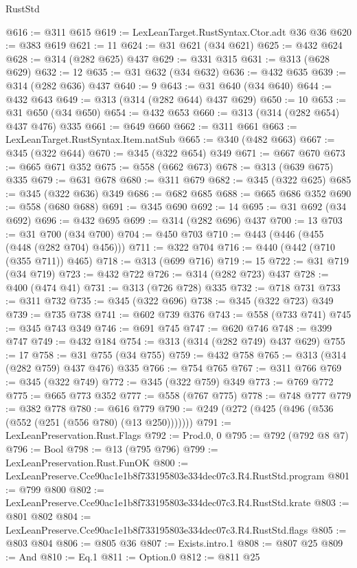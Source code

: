 \begin{lexlean}{RustStd}
\begin{coremodule}
@616 := @311 @615
@619 := LexLeanTarget.RustSyntax.Ctor.adt @36 @36
@620 := @383 @619
@621 := 11
@624 := @31 @621 (@34 @621)
@625 := @432 @624
@628 := @314 (@282 @625) @437
@629 := @331 @315
@631 := @313 (@628 @629)
@632 := 12
@635 := @31 @632 (@34 @632)
@636 := @432 @635
@639 := @314 (@282 @636) @437
@640 := 9
@643 := @31 @640 (@34 @640)
@644 := @432 @643
@649 := @313 (@314 (@282 @644) @437 @629)
@650 := 10
@653 := @31 @650 (@34 @650)
@654 := @432 @653
@660 := @313 (@314 (@282 @654) @437 @476) @335
@661 := @649 @660
@662 := @311 @661
@663 := LexLeanTarget.RustSyntax.Item.natSub
@665 := @340 (@482 @663)
@667 := @345 (@322 @644)
@670 := @345 (@322 @654) @349
@671 := @667 @670
@673 := @665 @671 @352
@675 := @558 (@662 @673)
@678 := @313 (@639 @675) @335
@679 := @631 @678
@680 := @311 @679
@682 := @345 (@322 @625)
@685 := @345 (@322 @636) @349
@686 := @682 @685
@688 := @665 @686 @352
@690 := @558 (@680 @688)
@691 := @345 @690
@692 := 14
@695 := @31 @692 (@34 @692)
@696 := @432 @695
@699 := @314 (@282 @696) @437
@700 := 13
@703 := @31 @700 (@34 @700)
@704 := @450 @703
@710 := @443 (@446 (@455 (@448 (@282 @704) @456)))
@711 := @322 @704
@716 := @440 (@442 (@710 (@355 @711)) @465)
@718 := @313 (@699 @716)
@719 := 15
@722 := @31 @719 (@34 @719)
@723 := @432 @722
@726 := @314 (@282 @723) @437
@728 := @400 (@474 @41)
@731 := @313 (@726 @728) @335
@732 := @718 @731
@733 := @311 @732
@735 := @345 (@322 @696)
@738 := @345 (@322 @723) @349
@739 := @735 @738
@741 := @602 @739 @376
@743 := @558 (@733 @741)
@745 := @345 @743 @349
@746 := @691 @745
@747 := @620 @746
@748 := @399 @747
@749 := @432 @184
@754 := @313 (@314 (@282 @749) @437 @629)
@755 := 17
@758 := @31 @755 (@34 @755)
@759 := @432 @758
@765 := @313 (@314 (@282 @759) @437 @476) @335
@766 := @754 @765
@767 := @311 @766
@769 := @345 (@322 @749)
@772 := @345 (@322 @759) @349
@773 := @769 @772
@775 := @665 @773 @352
@777 := @558 (@767 @775)
@778 := @748 @777
@779 := @382 @778
@780 := @616 @779
@790 := @249 (@272 (@425 (@496 (@536 (@552 (@251 (@556 @780) (@13 @250)))))))
@791 := LexLeanPreservation.Rust.Flags
@792 := Prod.{0, 0}
@795 := @792 (@792 @8 @7)
@796 := Bool
@798 := @13 (@795 @796)
@799 := LexLeanPreservation.Rust.FunOK
@800 := LexLeanPreserve.Cce90ac1e1b8f733195803e334dec07c3.R4.RustStd.program
@801 := @799 @800
@802 := LexLeanPreserve.Cce90ac1e1b8f733195803e334dec07c3.R4.RustStd.krate
@803 := @801 @802
@804 := LexLeanPreserve.Cce90ac1e1b8f733195803e334dec07c3.R4.RustStd.flags
@805 := @803 @804
@806 := @805 @36
@807 := Exists.intro.{1}
@808 := @807 @25
@809 := And
@810 := Eq.{1}
@811 := Option.{0}
@812 := @811 @25

\end{coremodule}
\end{lexlean}
